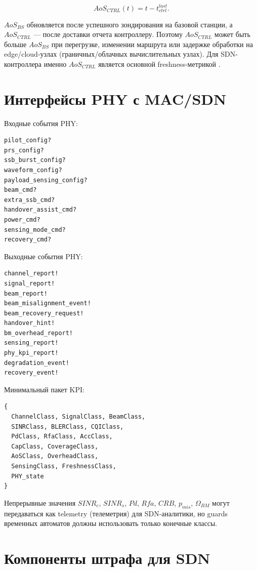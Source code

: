 \documentclass[12pt,a4paper]{article}
\begin{document}
\begin{equation}
AoS_{CTRL}(t)=t-t_{ctrl}^{last}.
\end{equation}

$AoS_{BS}$ обновляется после успешного зондирования на базовой станции, а $AoS_{CTRL}$ --- после доставки отчета контроллеру. Поэтому $AoS_{CTRL}$ может быть больше $AoS_{BS}$ при перегрузке, изменении маршрута или задержке обработки на edge/cloud-узлах (граничных/облачных вычислительных узлах). Для SDN-контроллера именно $AoS_{CTRL}$ является основной freshness-метрикой \cite{zanni2026aoi}.

\section{Интерфейсы PHY с MAC/SDN}

Входные события PHY:

\begin{verbatim}
pilot_config?
prs_config?
ssb_burst_config?
waveform_config?
payload_sensing_config?
beam_cmd?
extra_ssb_cmd?
handover_assist_cmd?
power_cmd?
sensing_mode_cmd?
recovery_cmd?
\end{verbatim}

Выходные события PHY:

\begin{verbatim}
channel_report!
signal_report!
beam_report!
beam_misalignment_event!
beam_recovery_request!
handover_hint!
bm_overhead_report!
sensing_report!
phy_kpi_report!
degradation_event!
recovery_event!
\end{verbatim}

Минимальный пакет KPI:

\begin{verbatim}
{
  ChannelClass, SignalClass, BeamClass,
  SINRClass, BLERClass, CQIClass,
  PdClass, RfaClass, AccClass,
  CapClass, CoverageClass,
  AoSClass, OverheadClass,
  SensingClass, FreshnessClass,
  PHY_state
}
\end{verbatim}

\noindent Непрерывные значения \(SINR_c\), \(SINR_s\), \(Pd\), \(Rfa\), \(CRB\), \(p_{mis}\), \(\Omega_{BM}\) могут передаваться как telemetry (телеметрия) для SDN-аналитики, но guards временных автоматов должны использовать только конечные классы.

\section{Компоненты штрафа для SDN}
\end{document}
